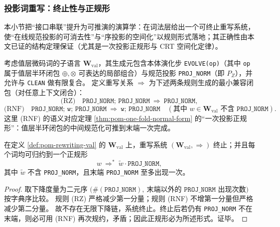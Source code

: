 \subsubsection{投影词重写：终止性与正规形}\label{subsec:pom-rewriting-calculus}
本小节把“接口串联”提升为可推演的演算学：在词法层给出一个可终止重写系统，使“在线规范投影的可消去性”与“序投影的空间化”以规则形式落地；其正确性由本文已证的结构定理保证（尤其是一次投影正规形与 CRT 空间化定律）。

\begin{definition}[值层投影词语言与规范化重写]\label{def:pom-rewriting-val}
考虑值层微码词的子语言 \(\mathbf{W}_{\mathrm{val}}\)，其生成元包含本体演化步 \texttt{EVOLVE(op)}（其中 \texttt{op} 属于值层半环闭包 \(\oplus,\otimes\) 可表达的局部组合）与规范投影 \texttt{PROJ\_NORM}（即 \(P_Z\)），并允许与 \texttt{CLEAN} 做有限复合。
定义重写关系 \(\Rightarrow\) 为下述两条规则生成的最小兼容闭包（对任意上下文闭合）：
\[
\text{(RZ)}\quad
\texttt{PROJ\_NORM;\ PROJ\_NORM}\ \Rightarrow\ \texttt{PROJ\_NORM},
\]
\[
\text{(RNF)}\quad
\texttt{PROJ\_NORM;\ w;\ PROJ\_NORM}\ \Rightarrow\ \texttt{w;\ PROJ\_NORM}
\quad (\text{其中 }w\in\mathbf{W}_{\mathrm{val}}\text{ 不含 }\texttt{PROJ\_NORM}).
\]
这里 (RNF) 的语义对应定理 \ref{thm:pom-one-fold-normal-form} 的“一次投影正规形”：值层半环闭包的中间规范化可推到末端一次完成。
\end{definition}

\begin{proposition}[终止性与正规形存在（值层）]\label{prop:pom-rewriting-terminating}
在定义 \ref{def:pom-rewriting-val} 的 \(\mathbf{W}_{\mathrm{val}}\) 上，重写系统 \((\mathbf{W}_{\mathrm{val}},\Rightarrow)\) 终止；并且每个词均可归约到一个正规形
\[
w\ \Rightarrow^\ast\ \widetilde w\cdot \texttt{PROJ\_NORM},
\]
其中 \(\widetilde w\) 不含 \texttt{PROJ\_NORM}，且末端 \texttt{PROJ\_NORM} 至多出现一次。
\end{proposition}
\begin{proof}
取下降度量为二元序
\(
\big(\#(\texttt{PROJ\_NORM}),\ \text{末端以外的 }\texttt{PROJ\_NORM}\text{ 出现次数}\big)
\)
按字典序比较。
规则 (RZ) 严格减少第一分量；规则 (RNF) 不增第一分量但严格减少第二分量。
故不存在无限下降链，系统终止。终止后若仍有 \texttt{PROJ\_NORM} 不在末端，则必可用 (RNF) 再次规约，矛盾；因此正规形必为所述形式。证毕。
\end{proof}




